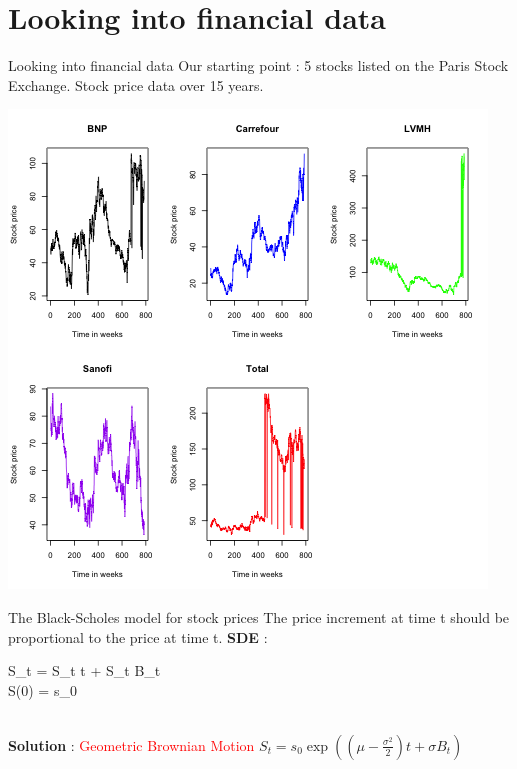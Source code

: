 \documentclass{beamer}
\begin{document}
\section{Looking into financial data}
\begin{frame}{Looking into financial data }
	Our starting point : 5 stocks listed on the Paris Stock Exchange. Stock price data over 15 years.
	\begin{center}
		\includegraphics[scale = 0.4]{plainData.png}
	\end{center}
\end{frame}

\begin{frame}{The Black-Scholes model for stock prices}
	The price increment at time t should be proportional to the price at time t. \newline
	\textbf{SDE} : \newline \\
	\begin{cases} S_t = \mu S_t t + \sigma S_t B_t \\ 
		S(0) = s_0 \\
	 \end{cases}
	 \newline \\
	 \textbf{Solution} : \textcolor{red}{Geometric Brownian Motion} \newline
	 $S_t = s_0 \exp((\mu -\frac{\sigma^2}{2}) t + \sigma B_t)$
\end{frame}
\end{document}
